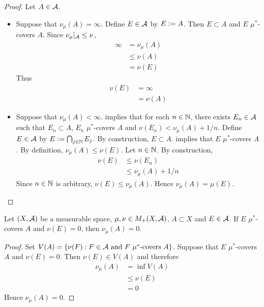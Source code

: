 \documentclass{book}
\begin{document}
	\begin{proof}
		Let $A \in \mathcal{A}$.
		\begin{itemize}
			\item Suppose that $\nu_{\mu}(A) = \infty$. Define $E \in \mathcal{A}$ by $E \vcentcolon= A$. Then $E \subset A$ and $E$ $\mu^*$-covers $A$. Since $\nu_{\mu}|_{\mathcal{A}} \leq \nu$, 
			\begin{align*}
				\infty 
				& = \nu_{\mu}(A) \\
				& \leq \nu(A) \\
				& = \nu(E)
			\end{align*}
			Thus 
			\begin{align*}
				\nu(E) 
				& = \infty \\ 
				& = \nu(A) 
			\end{align*}
			\item Suppose that $\nu_{\mu}(A) < \infty$.  implies that for each $n \in \mathbb{N}$, there exists $E_n \in \mathcal{A}$ such that $E_n \subset A$, $E_n$ $\mu^*$-covers $A$ and $\nu(E_n) < \nu_{\mu}(A) + 1/n$. Define $E \in \mathcal{A}$ by $E \vcentcolon= \bigcap_{j \in \mathbb{N}} E_j$. By construction, $E \subset A$.  implies that $E$ $\mu^*$-covers $A$. By definition, $\nu_{\mu}(A) \leq \nu(E)$. Let $n \in \mathbb{N}$. By construction,
			\begin{align*}
				\nu(E)
				& \leq \nu(E_n) \\
				& \leq \nu_{\mu}(A) + 1/n
			\end{align*}
			Since $n \in \mathbb{N}$ is arbitrary, $\nu(E) \leq \nu_{\mu}(A)$. Hence $\nu_{\mu}(A) = \mu(E)$. 
		\end{itemize}
	\end{proof}


	\begin{ex}   
		Let $(X, \mathcal{A})$ be a measurable space, $\mu, \nu \in M_+(X, \mathcal{A})$, $A \subset X$ and $E \in \mathcal{A}$. If $E$ $\mu^*$-covers $A$ and $\nu(E) = 0$, then $\nu_{\mu}(A) = 0$. 
	\end{ex}

	\begin{proof}
		Set $V(A) = \{\nu(F): F \in \mathcal{A} \text{ and $F$ $\mu^*$-covers $A$}\}$. Suppose that $E$ $\mu^*$-covers $A$ and $\nu(E) = 0$. Then $\nu(E) \in V(A)$ and therefore
		\begin{align*}
			\nu_{\mu}(A)
			& = \inf V(A) \\
			& \leq \nu(E) \\
			& = 0
		\end{align*}
		Hence $\nu_{\mu}(A) = 0$.
	\end{proof}
\end{document}
